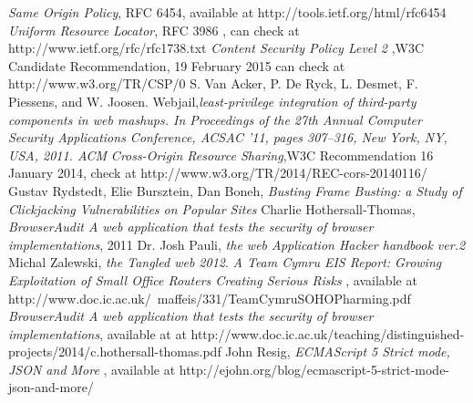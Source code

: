 \documentclass[a4paper,12pt]{report}
\begin{document}
\begin{thebibliography}{1}
  \emph {Same Origin Policy}, RFC 6454, available at  http://tools.ietf.org/html/rfc6454
  \emph{Uniform Resource Locator}, RFC 3986 , can check at http://www.ietf.org/rfc/rfc1738.txt
  \emph{Content Security Policy Level 2} ,W3C Candidate Recommendation, 19 February 2015 can check at http://www.w3.org/TR/CSP/0
  S. Van Acker, P. De Ryck, L. Desmet, F. Piessens, and W. Joosen. Webjail,\emph {least-privilege integration of third-party components in web mashups. In Proceedings of the 27th Annual Computer Security
Applications Conference, ACSAC ’11, pages 307–316, New York, NY, USA, 2011. ACM}
 \emph{Cross-Origin Resource Sharing},W3C Recommendation 16 January 2014, check at http://www.w3.org/TR/2014/REC-cors-20140116/
  Gustav Rydstedt, Elie Bursztein, Dan Boneh, \emph{Busting Frame Busting: a Study of Clickjacking Vulnerabilities on Popular Sites} 
  Charlie Hothersall-Thomas, \emph{BrowserAudit A web application that tests the security of browser implementations}, 2011
  Dr. Josh Pauli, \emph{the web Application Hacker handbook ver.2}
  Michal Zalewski, \emph{the Tangled web 2012}.
  \emph{ A Team Cymru EIS Report: Growing Exploitation of Small Office Routers Creating Serious Risks} , available at http://www.doc.ic.ac.uk/~maffeis/331/TeamCymruSOHOPharming.pdf
  \emph {BrowserAudit A web application that tests the security of browser implementations}, available at at http://www.doc.ic.ac.uk/teaching/distinguished-projects/2014/c.hothersall-thomas.pdf
  John Resig, \emph {ECMAScript 5 Strict mode, JSON and More} , available at http://ejohn.org/blog/ecmascript-5-strict-mode-json-and-more/
 \end{thebibliography}
\end{document}
